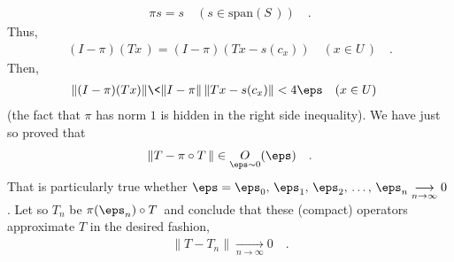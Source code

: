 \begin{align}
\pi s = s \quad (s\in\text{span}(S\,))\quad .
\end{align}
Thus,
\begin{align}
(I-\pi) (Tx\,)= (I-\pi ) (Tx - s(c_x)) \quad (x\in U\,)\quad .
\end{align}
Then,
\begin{align}
\|( I- \pi )(T x) \| \< \| I- \pi \| \, \| Tx -s(c_x)\| < 4 \eps  \quad (x\in U)\quad 
\end{align}
(the fact that $\pi$ has norm $1$ is hidden in the right side inequality). We have just so proved that 
\begin{align}
\| T-\pi\circ T\, \| \in \underset{\eps \sim 0}{O}(\eps) \quad . 
\end{align}
That is particularly true whether $\eps=\eps_0,\, \eps_1,\, \eps_2,\, \dots ,\, \eps_n \underset{n\to \infty}{\longrightarrow} 0\,$. Let so $T_n$ be $ \pi(\eps_n) \circ T\,$ and conclude that these (compact) operators approximate $T$ in the desired fashion, \ie
\begin{align}
\| T-T_n \| \underset{n \to \infty}{\longrightarrow} 0\quad .
\end{align}
\QED
